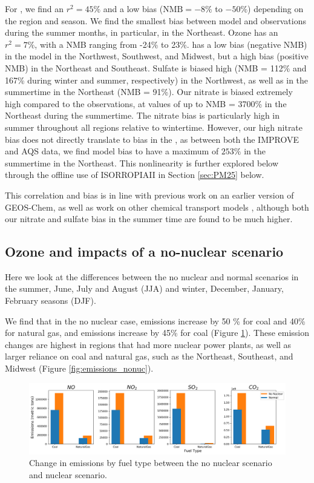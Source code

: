 \documentclass[12]{article}
\begin{document}
For , we find an $r^2 = 45\%$ and a low bias ($\text{NMB} = -8\%$ to $-50\%$) depending on the region and season. We find the smallest bias between model  and observations during the summer months, in particular, in the Northeast. Ozone has an $r^2 = 7\%$, with a NMB ranging from -24\% to 23\%.  has a low bias (negative NMB) in the model in the Northwest, Southwest, and Midwest, but a high bias (positive NMB) in the Northeast and Southeast. Sulfate is biased high (NMB = 112\% and 167\% during winter and summer, respectively) in the Northwest, as well as in the summertime in the Northeast (NMB = 91\%). Our nitrate is biased extremely high compared to the observations, at values of up to NMB = 3700\% in the Northeast during the summertime. The nitrate bias is particularly high in summer throughout all regions relative to wintertime. However, our high nitrate bias does not directly translate to bias in the , as between both the IMPROVE and AQS data, we find model bias to have a maximum of $253\%$ in the summertime in the Northeast. This nonlinearity is further explored below through the offline use of ISORROPIAII in Section \ref{sec:PM25} below. 

This correlation and bias is in line with previous work \citep{holt_changes_2015} on an earlier version of GEOS-Chem, as well as work on other chemical transport models \citep{simon_compilation_2012}, although both our nitrate and sulfate bias in the summer time are found to be much higher.

\subsection{Ozone and  impacts of a no-nuclear scenario}
Here we look at the differences between the no nuclear and normal scenarios in the summer, June, July and August (JJA) and winter, December, January, February seasons (DJF). 

We find that in the no nuclear case,  emissions increase by 50 \% for coal and 40\% for natural gas, and  emissions increase by 45\% for coal (Figure \ref{fig:emissions_comp}). These emission changes are highest in regions that had more nuclear power plants, as well as larger reliance on coal and natural gas, such as the Northeast, Southeast, and Midwest (Figure \ref{fig:emissions_nonuc}). 

\begin{figure}[!htbp]
    \centering
    \includegraphics[scale=0.6]{ego_nonuclear_project/Figures/emissions_fueltype.png}
    \caption{Change in emissions by fuel type between the no nuclear scenario and nuclear scenario.} 
    \label{fig:emissions_comp}
\end{figure}
\end{document}

